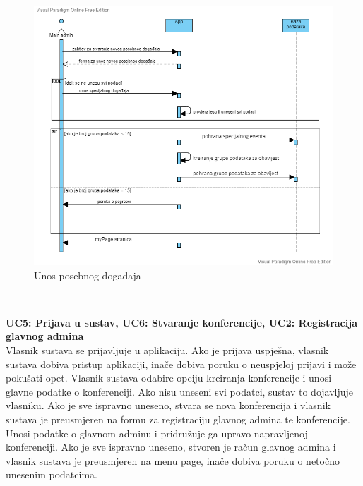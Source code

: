 		        \begin{figure}[H]
			            \includegraphics[scale=0.55]{slike/stvaranje spec eventa.png} %
			            \centering
			            \caption{Unos posebnog događaja}
			            \label{fig:seq-dijagram2}
		        \end{figure}\\
				
				\eject

             \textbf{UC5: Prijava u sustav, UC6: Stvaranje konferencije, UC2: Registracija glavnog admina}\\
				
				{Vlasnik sustava se prijavljuje u aplikaciju. Ako je prijava uspješna, vlasnik sustava dobiva pristup aplikaciji, inače dobiva poruku o neuspjeloj prijavi i može pokušati opet. Vlasnik sustava odabire opciju kreiranja konferencije i unosi glavne podatke o konferenciji. Ako nisu uneseni svi podatci, sustav to dojavljuje vlasniku. Ako je sve ispravno uneseno, stvara se nova konferencija i vlasnik sustava je preusmjeren na formu za registraciju glavnog admina te konferencije. Unosi podatke o glavnom adminu i pridružuje ga upravo napravljenoj konferenciji. Ako je sve ispravno uneseno, stvoren je račun glavnog admina i vlasnik sustava je preusmjeren na menu page, inače dobiva poruku o netočno unesenim podatcima.}
				
